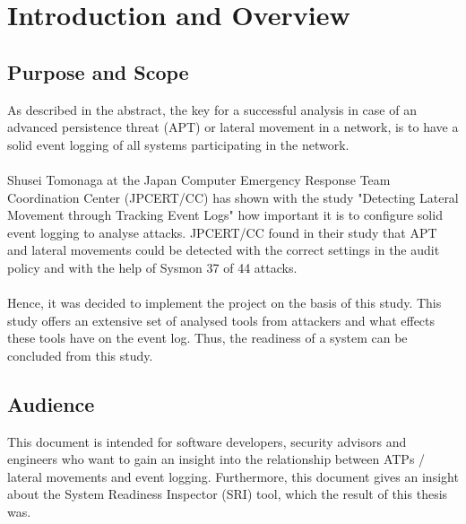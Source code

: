 \section{Introduction and Overview}
\subsection{Purpose and Scope}
As described in the abstract, the key for a successful analysis in case of an advanced persistence threat (APT) or lateral movement in a network, is to have a solid event logging of all systems participating in the network.
\\\\
Shusei Tomonaga at the Japan Computer Emergency Response Team Coordination Center (JPCERT/CC) has shown with the study "Detecting Lateral Movement through Tracking Event Logs" \cite{JPCERTDetectingLateralMovement} how important it is to configure solid event logging to analyse attacks. JPCERT/CC found in their study that APT and lateral movements could be detected with the correct settings in the audit policy and with the help of Sysmon 37 of 44 attacks.
\\\\
Hence, it was decided to implement the project on the basis of this study. This study offers an extensive set of analysed tools from attackers and what effects these tools have on the event log. Thus, the readiness of a system can be concluded from this study.

\subsection{Audience}
This document is intended for software developers, security advisors and engineers who want to gain an insight into the relationship between ATPs / lateral movements and event logging. Furthermore, this document gives an insight about the System Readiness Inspector (SRI) tool, which the result of this thesis was.

